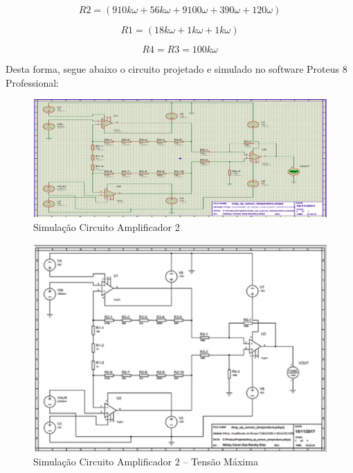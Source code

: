 \begin{equation}\label{eq1tc}
    R2 = (910k\omega + 56k\omega + 9100\omega + 390\omega + 120\omega)
\end{equation}

\begin{equation}\label{eq1tc}
    R1 = (18k\omega + 1k\omega + 1k\omega)
\end{equation}

\begin{equation}\label{eq1tc}
    R4 = R3 = 100k\omega
\end{equation}

Desta forma, segue abaixo o circuito projetado e simulado no software Proteus 8 Professional:

\begin{figure}[!htb]                  
	\centering                          
	\includegraphics[scale=0.6]{figuras/circ1.eps}
	\caption{ Simulação Circuito Amplificador 2 }  \label{figamp2}           
\end{figure}

\begin{figure}[!htb]                  
	\centering                          
	\includegraphics[scale=0.5]{figuras/circ2.eps}
	\caption{ Simulação Circuito Amplificador 2 – Tensão Máxima } \label{figamp21}                
\end{figure}

